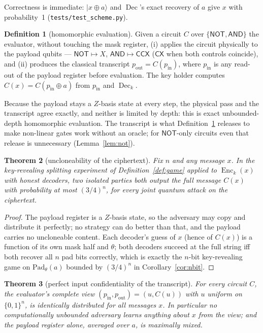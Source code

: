 \documentclass[11pt]{article}
\newtheorem{theorem}{Theorem}[section]
\theoremstyle{definition}
\newtheorem{definition}[theorem]{Definition}
\DeclareMathOperator{\Enc}{Enc} \DeclareMathOperator{\Dec}{Dec}
\begin{document}
Correctness is immediate: $|x\oplus a\rangle$ and $\Dec$'s exact recovery of $a$
give $x$ with probability~1 (\texttt{tests/test\_scheme.py}).

\begin{definition}[homomorphic evaluation]\label{def:eval}
Given a circuit $C$ over $\{\mathsf{NOT},\mathsf{AND}\}$ the evaluator, without
touching the mask register, (i) applies the circuit physically to the payload
qubits --- $\mathsf{NOT} \mapsto X$, $\mathsf{AND} \mapsto \mathsf{CCX}$
($\mathsf{CX}$ when both controls coincide), and (ii) produces the classical
transcript $p_{\mathrm{out}} = C(p_{\mathrm{in}})$, where
$p_{\mathrm{in}}$ is any read-out of the payload register before evaluation.
The key holder computes $C(x) = C(p_{\mathrm{in}} \oplus a)$ from
$p_{\mathrm{in}}$ and $\Dec_k$.
\end{definition}

Because the payload stays a $Z$-basis state at every step, the physical pass and
the transcript agree exactly, and neither is limited by depth: this is exact
unbounded-depth homomorphic evaluation.  The transcript is what Definition~\ref{def:eval}
releases to make non-linear gates work without an oracle; for $\mathsf{NOT}$-only
circuits even that release is unnecessary (Lemma~\ref{lem:not}).

\begin{theorem}[uncloneability of the ciphertext]\label{thm:secret}
Fix $n$ and any message $x$.  In the key-revealing splitting experiment of
Definition~\ref{def:game} applied to $\Enc_k(x)$ with honest decoders, two
isolated parties both output the full message $C(x)$ with probability at most
$(3/4)^n$, for every joint quantum attack on the ciphertext.
\end{theorem}

\begin{proof}
The payload register is a $Z$-basis state, so the adversary may copy and
distribute it perfectly; no strategy can do better than that, and the payload
carries no uncloneable content.  Each decoder's guess of $x$ (hence of $C(x)$)
is a function of its own mask half and $\theta$; both decoders succeed at the
full string iff both recover all $n$ pad bits correctly, which is exactly the
$n$-bit key-revealing game on $\mathrm{Pad}_\theta(a)$ bounded by
$(3/4)^n$ in Corollary~\ref{cor:nbit}.
\end{proof}

\begin{theorem}[perfect input confidentiality of the transcript]\label{thm:sec2}
For every circuit $C$, the evaluator's complete view
$(p_{\mathrm{in}}, p_{\mathrm{out}}) = (u, C(u))$ with $u$ uniform on
$\{0,1\}^n$, is identically distributed for all messages $x$.  In particular no
computationally unbounded adversary learns anything about $x$ from the view;
and the payload register alone, averaged over $a$, is maximally mixed.
\end{theorem}
\end{document}
